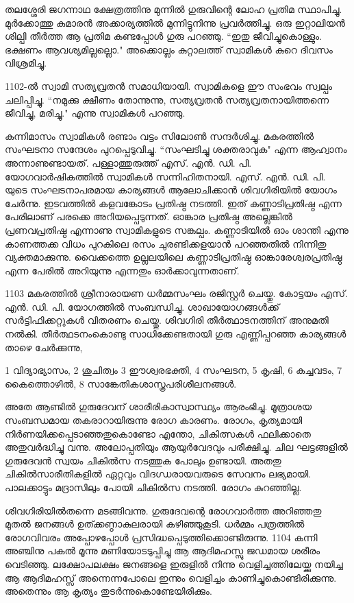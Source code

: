 \documentclass[12pt,openany]{book}
\begin{document}
	തലശ്ശേരി ജഗന്നാഥ ക്ഷേത്രത്തിനു മുന്നിൽ ഗുരുവിന്റെ ലോഹ പ്രതിമ സ്ഥാപിച്ചു. മുർക്കോത്തു കുമാരൻ അക്കാര്യത്തിൽ മുന്നിട്ടുനിന്നു പ്രവർത്തിച്ചു. ഒരു ഇറ്റാലിയൻ ശില്പി തീർത്ത ആ പ്രതിമ കണ്ടപ്പോൾ ഗുരു പറഞ്ഞു. ``ഇതു ജീവിച്ചുകൊള്ളും. ഭക്ഷണം ആവശ്യമില്ലല്ലൊ." അക്കൊല്ലം കുറ്റാലത്ത് സ്വാമികൾ കുറെ ദിവസം വിശ്രമിച്ചു.
	
	1102-ൽ സ്വാമി സത്യവ്രതൻ സമാധിയായി. സ്വാമികളെ ഈ സംഭവം സ്വല്പം ചലിപ്പിച്ചു. ``നമുക്കു ക്ഷീണം തോന്നുന്നു, സത്യവ്രതൻ സത്യവ്രതനായിത്തന്നെ ജീവിച്ചു, മരിച്ചു." എന്നു സ്വാമികൾ പറഞ്ഞു.
	
	കന്നിമാസം സ്വാമികൾ രണ്ടാം വട്ടം സിലോൺ സന്ദർശിച്ചു. മകരത്തിൽ സംഘടനാ സന്ദേശം പുറപ്പെടുവിച്ചു. ``സംഘടിച്ചു ശക്തരാവുക" എന്ന ആഹ്വാനം അന്നാണുണ്ടായത്. പള്ളാത്തുരുത്ത് എസ്. എൻ. ഡി. പി. യോഗവാർഷികത്തിൽ സ്വാമികൾ സന്നിഹിതനായി. എസ്. എൻ. ഡി. പി. യുടെ സംഘടനാപരമായ കാര്യങ്ങൾ ആലോചിക്കാൻ ശിവഗിരിയിൽ യോഗം ചേർന്നു. ഇടവത്തിൽ കളവങ്കോടം പ്രതിഷ്ഠ നടത്തി. ഇത് കണ്ണാടിപ്രതിഷ്ഠ എന്ന പേരിലാണ് പരക്കെ അറിയപ്പെടുന്നത്. ഓങ്കാര പ്രതിഷ്ഠ അല്ലെങ്കിൽ പ്രണവപ്രതിഷ്ഠ എന്നാണു സ്വാമികളുടെ സങ്കല്പം. കണ്ണാടിയിൽ ഓം ശാന്തി എന്നു കാണത്തക്ക വിധം പുറകിലെ രസം ചുരണ്ടിക്കളയാൻ പറഞ്ഞതിൽ നിന്നിതു വ്യക്തമാക്കുന്നു. വൈക്കത്തെ ഉല്ലലയിലെ കണ്ണാടിപ്രതിഷ്ഠ ഓങ്കാരേശ്വരപ്രതിഷ്ഠ എന്ന പേരിൽ അറിയുന്നു എന്നതും ഓർക്കാവുന്നതാണ്.
	
	1103 മകരത്തിൽ ശ്രീനാരായണ ധർമ്മസംഘം രജിസ്റ്റർ ചെയ്തു. കോട്ടയം എസ്. എൻ. ഡി. പി. യോഗത്തിൽ സംബന്ധിച്ചു. ശാഖായോഗങ്ങൾക്ക് സർട്ടിഫിക്കറ്റുകൾ വിതരണം ചെയ്തു. ശിവഗിരി തീർത്ഥാടനത്തിന് അനുമതി നൽകി. തീർത്ഥടനംകൊണ്ടു സാധിക്കേണ്ടതായി ഗുരു എണ്ണിപ്പറഞ്ഞ കാര്യങ്ങൾ താഴെ ചേർക്കുന്നു,
	
	1 വിദ്യാഭ്യാസം, 2 ശുചിത്വം 3 ഈശ്വരഭക്തി, 4 സംഘടന, 5 കൃഷി, 6 കച്ചവടം, 7 കൈത്തൊഴിൽ, 8 സാങ്കേതികശാസ്ത്രപരിശീലനങ്ങൾ.
	
	അതേ ആണ്ടിൽ ഗുരുദേവന് ശാരീരികാസ്വാസ്ഥ്യം ആരംഭിച്ചു. മൂത്രാശയ സംബന്ധമായ തകരാറായിരുന്നു രോഗ കാരണം. രോഗം, കൃത്യമായി നിർണയിക്കപ്പെടാഞ്ഞതുകൊണ്ടോ എന്തോ, ചികിത്സകൾ ഫലിക്കാതെ അതുവർദ്ധിച്ചു വന്നു. അലോപ്പതിയും ആയുർവേദവും പരീക്ഷിച്ചു. ചില ഘട്ടങ്ങളിൽ ഗുരുദേവൻ സ്വയം ചികിൽസ നടത്തുക പോലും ഉണ്ടായി. അതതു ചികിൽസാരീതികളിൽ ഏറ്റവും വിദഗ്ധരായവരുടെ സേവനം ലഭ്യമായി. പാലക്കാട്ടും മദ്രാസിലും പോയി ചികിൽസ നടത്തി. രോഗം കുറഞ്ഞില്ല.
	
	ശിവഗിരിയിൽതന്നെ മടങ്ങിവന്നു. ഗുരുദേവന്റെ രോഗവാർത്ത അറിഞ്ഞതു മുതൽ ജനങ്ങൾ ഉത്ക്കണ്ഠാകുലരായി കഴിഞ്ഞുകൂടി. ധർമ്മം പത്രത്തിൽ രോഗവിവരം അപ്പോഴപ്പോൾ പ്രസിദ്ധപ്പെടുത്തിക്കൊണ്ടിരുന്നു. 1104 കന്നി അഞ്ചിനു പകൽ മൂന്നു മണിയോടടുപ്പിച്ചു ആ ആദിമഹസ്സു ജഡമായ ശരീരം വെടിഞ്ഞു. ലക്ഷോപലക്ഷം ജനങ്ങളെ ഇരുളിൽ നിന്നു വെളിച്ചത്തിലേയ്ക്കു നയിച്ച ആ ആദിമഹസ്സ് അന്നെന്നപോലെ ഇന്നും വെളിച്ചം കാണിച്ചുകൊണ്ടിരിക്കുന്നു. അതെന്നും ആ കൃത്യം തുടർന്നുകൊണ്ടേയിരിക്കും.
	
\end{document}
